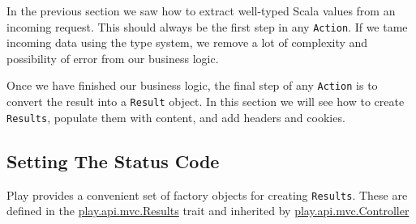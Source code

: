 \documentclass[oneside,11pt,a4paper,]{book}
\begin{document}
In the previous section we saw how to extract well-typed Scala values
from an incoming request. This should always be the first step in any
\texttt{Action}. If we tame incoming data using the type system, we
remove a lot of complexity and possibility of error from our business
logic.

Once we have finished our business logic, the final step of any
\texttt{Action} is to convert the result into a \texttt{Result} object.
In this section we will see how to create \texttt{Results}, populate
them with content, and add headers and cookies.

\subsection{Setting The Status Code}\label{setting-the-status-code}

Play provides a convenient set of factory objects for creating
\texttt{Results}. These are defined in the
\href{https://www.playframework.com/documentation/2.3.x/api/scala/index.html\#play.api.mvc.Results}{play.api.mvc.Results}
trait and inherited by
\href{https://www.playframework.com/documentation/2.3.x/api/scala/index.html\#play.api.mvc.Controller}{play.api.mvc.Controller}
\end{document}
